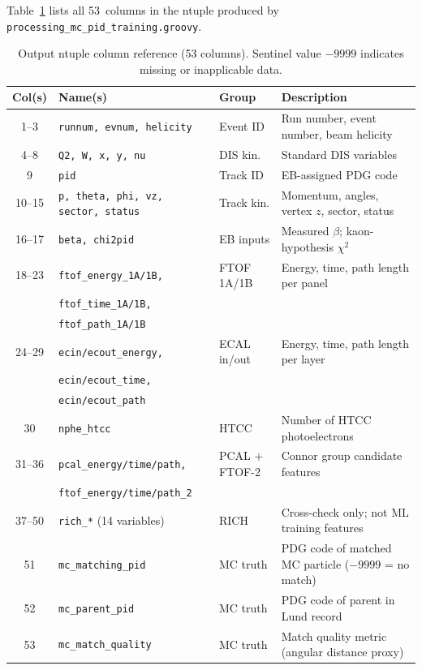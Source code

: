 \documentclass[11pt]{article}
\begin{document}
Table~\ref{tab:columns} lists all 53~columns in the ntuple produced by
\texttt{processing\_mc\_pid\_training.groovy}.

\begin{table}[h]
  \centering
  \caption{Output ntuple column reference (53 columns).
           Sentinel value $-9999$ indicates missing or inapplicable data.}
  \label{tab:columns}
  \small
  \begin{tabular}{clll}
    \toprule
    Col(s) & Name(s) & Group & Description \\
    \midrule
    1--3   & \texttt{runnum, evnum, helicity}          & Event ID      & Run number, event number, beam helicity \\
    4--8   & \texttt{Q2, W, x, y, nu}                  & DIS kin.      & Standard DIS variables \\
    9      & \texttt{pid}                               & Track ID      & EB-assigned PDG code \\
    10--15 & \texttt{p, theta, phi, vz, sector, status} & Track kin.   & Momentum, angles, vertex $z$, sector, status \\
    16--17 & \texttt{beta, chi2pid}                     & EB inputs     & Measured $\beta$; kaon-hypothesis $\chi^2$ \\
    18--23 & \texttt{ftof\_energy\_1A/1B,}              & FTOF 1A/1B    & Energy, time, path length per panel \\
           & \texttt{ftof\_time\_1A/1B,}                &               & \\
           & \texttt{ftof\_path\_1A/1B}                 &               & \\
    24--29 & \texttt{ecin/ecout\_energy,}               & ECAL in/out   & Energy, time, path length per layer \\
           & \texttt{ecin/ecout\_time,}                  &               & \\
           & \texttt{ecin/ecout\_path}                  &               & \\
    30     & \texttt{nphe\_htcc}                        & HTCC          & Number of HTCC photoelectrons \\
    31--36 & \texttt{pcal\_energy/time/path,}           & PCAL + FTOF-2 & Connor group candidate features \\
           & \texttt{ftof\_energy/time/path\_2}         &               & \\
    37--50 & \texttt{rich\_*} (14 variables)            & RICH          & Cross-check only; not ML training features \\
    51     & \texttt{mc\_matching\_pid}                 & MC truth      & PDG code of matched MC particle ($-9999$ = no match) \\
    52     & \texttt{mc\_parent\_pid}                   & MC truth      & PDG code of parent in Lund record \\
    53     & \texttt{mc\_match\_quality}                & MC truth      & Match quality metric (angular distance proxy) \\
    \bottomrule
  \end{tabular}
\end{table}



\end{document}
